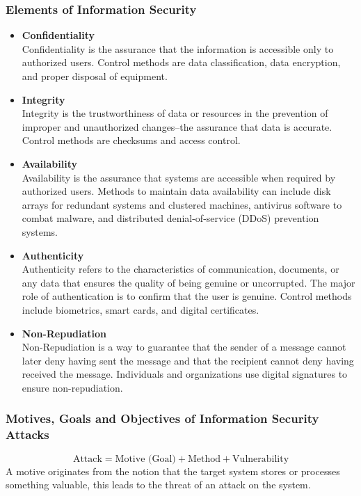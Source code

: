 \subsubsection{Elements of Information Security}
\begin{itemize}
    \item \textbf{Confidentiality}\\
    Confidentiality is the assurance that the information is accessible only to authorized users.
    Control methods are data classification, data encryption, and proper disposal of equipment.
    \item \textbf{Integrity}\\
    Integrity is the trustworthiness of data or resources in the prevention of improper and unauthorized changes--the assurance that data is accurate. 
    Control methods are checksums and access control.
    \item \textbf{Availability}\\
    Availability is the assurance that systems are accessible when required by authorized users.
    Methods to maintain data availability can include disk arrays for redundant systems and clustered machines, antivirus software to combat malware, and distributed denial-of-service (DDoS) prevention systems.
    \item \textbf{Authenticity}\\
    Authenticity refers to the characteristics of communication, documents, or any data that ensures the quality of being genuine or uncorrupted.
    The major role of authentication is to confirm that the user is genuine.
    Control methods include biometrics, smart cards, and digital certificates.
    \item \textbf{Non-Repudiation}\\
    Non-Repudiation is a way to guarantee that the sender of a message cannot later deny having sent the message and that the recipient cannot deny having received the message.
    Individuals and organizations use digital signatures to ensure non-repudiation.
\end{itemize}

\subsubsection{Motives, Goals and Objectives of Information Security Attacks}

\begin{equation*}
    \text{Attack} = \text{Motive (Goal)} + \text{Method} + \text{Vulnerability}
\end{equation*}
A motive originates from the notion that the target system stores or processes something valuable, this leads to the threat of an attack on the system.

